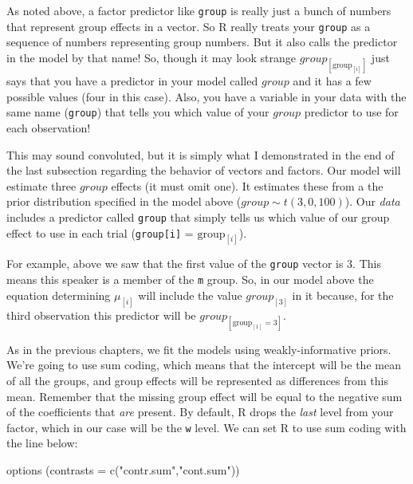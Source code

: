\documentclass[
]{book}
\newenvironment{Shaded}{\begin{snugshade}}{\end{snugshade}}
\newcommand{\AttributeTok}[1]{\textcolor[rgb]{0.77,0.63,0.00}{#1}}
\newcommand{\FunctionTok}[1]{\textcolor[rgb]{0.00,0.00,0.00}{#1}}
\newcommand{\NormalTok}[1]{#1}
\newcommand{\StringTok}[1]{\textcolor[rgb]{0.31,0.60,0.02}{#1}}
\begin{document}
As noted above, a factor predictor like \texttt{group} is really just a bunch of numbers that represent group effects in a vector. So R really treats your \texttt{group} as a sequence of numbers representing group numbers. But it also calls the predictor in the model by that name! So, though it may look strange \(group_{[\mathrm{group}_{[i]}]}\) just says that you have a predictor in your model called \(group\) and it has a few possible values (four in this case). Also, you have a variable in your data with the same name (\texttt{group}) that tells you which value of your \(group\) predictor to use for each observation!

This may sound convoluted, but it is simply what I demonstrated in the end of the last subsection regarding the behavior of vectors and factors. Our model will estimate three \(group\) effects (it must omit one). It estimates these from a the prior distribution specified in the model above (\(group \sim t(3, 0, 100)\)). Our \emph{data} includes a predictor called \texttt{group} that simply tells us which value of our group effect to use in each trial (\texttt{group{[}i{]}} = \(\mathrm{group}_{[i]}\)).

For example, above we saw that the first value of the \texttt{group} vector is 3. This means this speaker is a member of the \texttt{m} group. So, in our model above the equation determining \(\mu_{[i]}\) will include the value \(group_{[3]}\) in it because, for the third observation this predictor will be \(group_{[\mathrm{group}_{[1]}=3]}\).

As in the previous chapters, we fit the models using weakly-informative priors. We're going to use sum coding, which means that the intercept will be the mean of all the groups, and group effects will be represented as differences from this mean. Remember that the missing group effect will be equal to the negative sum of the coefficients that \emph{are} present. By default, R drops the \emph{last} level from your factor, which in our case will be the \texttt{w} level. We can set R to use sum coding with the line below:

\begin{Shaded}
\begin{Highlighting}[]
\FunctionTok{options}\NormalTok{ (}\AttributeTok{contrasts =} \FunctionTok{c}\NormalTok{(}\StringTok{"contr.sum"}\NormalTok{,}\StringTok{"cont.sum"}\NormalTok{))}
\end{Highlighting}
\end{Shaded}
\end{document}
